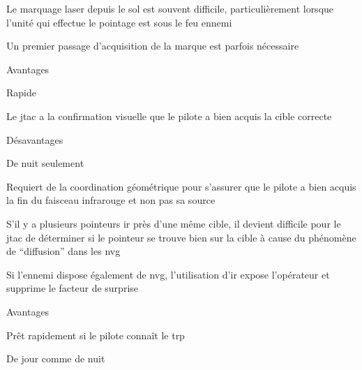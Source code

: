\begin{e1}
\begin{e2}
\begin{e3}
\begin{e4}
\begin{e5}
\begin{e6}
							\item Le marquage laser depuis le sol est souvent difficile, particulièrement lorsque l'unité qui effectue le pointage est sous le feu ennemi
							\item Un premier passage d'acquisition de la marque est parfois nécessaire
					\end{e6}
				\end{e5}
				\begin{e5}
					\item Avantages
					\begin{e6}
						\item Rapide
						\item Le \gls{jtac} a la confirmation visuelle que le pilote a bien acquis la cible correcte							
					\end{e6}
					\item Désavantages
					\begin{e6}
						\item De nuit seulement
						\item Requiert de la coordination géométrique pour s'assurer que le pilote a bien acquis la fin du faisceau infrarouge et non pas sa source
						\item S'il y a plusieurs pointeurs \gls{ir} près d'une même cible, il devient difficile pour le \gls{jtac} de déterminer si le pointeur se trouve bien sur la cible à cause du phénomène de ``diffusion'' dans les \gls{nvg}
						\item Si l'ennemi dispose également de \gls{nvg}, l'utilisation d'\gls{ir} expose l'opérateur et supprime le facteur de surprise
					\end{e6}
				\end{e5}
				\itemt{Marquage à partir d'un \gls{trp}}{}
				\begin{e5}
					\item Avantages
					\begin{e6}
						\item Prêt rapidement si le pilote connaît le \gls{trp}
						\item De jour comme de nuit

\end{e6}
\end{e5}
\end{e4}
\end{e3}
\end{e2}
\end{e1}
